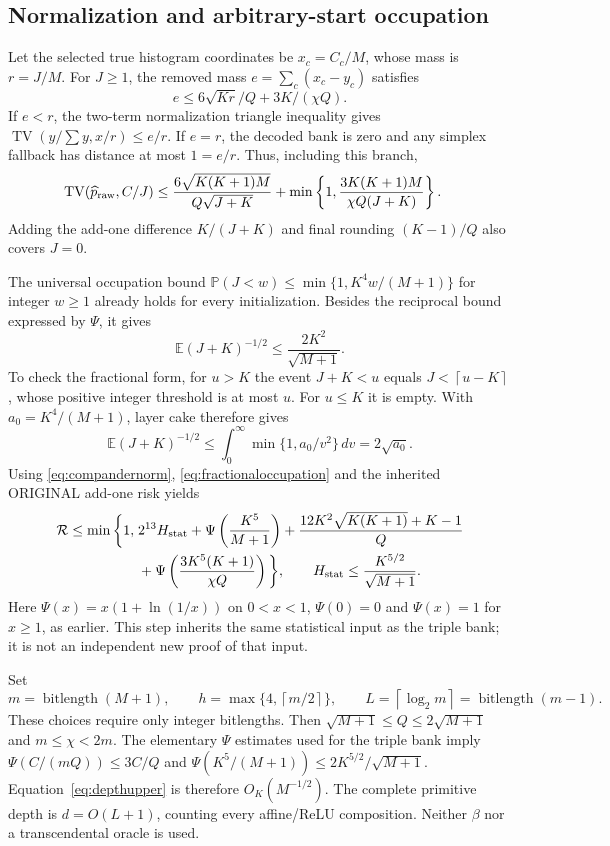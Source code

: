 \documentclass[11pt,letterpaper]{article}
\theoremstyle{definition}\newtheorem{definition}[theorem]{Definition}
\theoremstyle{remark}\newtheorem{remark}[theorem]{Remark}
\newcommand{\TV}{\operatorname{TV}}
\newcommand{\E}{\mathbb{E}}
\newcommand{\Prob}{\mathbb{P}}
\newcommand{\ceil}[1]{\left\lceil #1\right\rceil}
\newcommand{\Risk}{\mathcal{R}}
\newcommand{\bl}{\operatorname{bitlength}}
\begin{document}
\subsection{Normalization and arbitrary-start occupation}
Let the selected true histogram coordinates be $x_c=C_c/M$, whose mass is $r=J/M$. For $J\ge1$, the removed mass $e=\sum_c(x_c-y_c)$ satisfies
\[
 e\le6\sqrt{Kr}/Q+3K/(\chi Q).
\]
If $e<r$, the two-term normalization triangle inequality gives
$\TV(y/\sum y,x/r)\le e/r$. If $e=r$, the decoded bank is zero and any simplex fallback has distance at most $1=e/r$. Thus, including this branch,
\begin{align}\label{eq:compandernorm}
 \TV(\widehat p_{\rm raw},C/J)
 &\le\frac{6\sqrt{K(K+1)M}}{Q\sqrt{J+K}}
   +\min\left\{1,\frac{3K(K+1)M}{\chi Q(J+K)}\right\}.
\end{align}
Adding the add-one difference $K/(J+K)$ and final rounding $(K-1)/Q$ also covers $J=0$.

The universal occupation bound
$\Prob(J<w)\le\min\{1,K^4w/(M+1)\}$ for integer $w\ge1$
already holds for every initialization. Besides the reciprocal bound expressed by $\Psi$, it gives
\begin{equation}\label{eq:fractionaloccupation}
 \E(J+K)^{-1/2}\le\frac{2K^2}{\sqrt{M+1}}.
\end{equation}
To check the fractional form, for $u>K$ the event $J+K<u$ equals
$J<\ceil{u-K}$, whose positive integer threshold is at most $u$.
For $u\le K$ it is empty. With $a_0=K^4/(M+1)$, layer cake therefore gives
\[
 \E(J+K)^{-1/2}
 \le\int_0^\infty\min\{1,a_0/v^2\}\,dv=2\sqrt{a_0}.
\]
Using \eqref{eq:compandernorm}, \eqref{eq:fractionaloccupation} and the inherited ORIGINAL add-one risk yields
\begin{equation}\label{eq:depthupper}
 \begin{split}
 \Risk\le\min\bigg\{1,\;&2^{13}H_{\rm stat}
 +\Psi\left(\frac{K^5}{M+1}\right)
 +\frac{12K^2\sqrt{K(K+1)}+K-1}{Q}\\
 &+\Psi\left(\frac{3K^5(K+1)}{\chi Q}\right)\bigg\},
 \qquad H_{\rm stat}\le\frac{K^{5/2}}{\sqrt{M+1}}.
 \end{split}
\end{equation}
Here $\Psi(x)=x(1+\ln(1/x))$ on $0<x<1$, $\Psi(0)=0$ and $\Psi(x)=1$ for $x\ge1$, as earlier. This step inherits the same statistical input as the triple bank; it is not an independent new proof of that input.

Set
\[
 m=\bl(M+1),\qquad h=\max\{4,\ceil{m/2}\},\qquad
 L=\ceil{\log_2m}=\bl(m-1).
\]
These choices require only integer bitlengths. Then
$\sqrt{M+1}\le Q\le2\sqrt{M+1}$ and $m\le\chi<2m$.
The elementary $\Psi$ estimates used for the triple bank imply
$\Psi(C/(mQ))\le3C/Q$ and
$\Psi(K^5/(M+1))\le2K^{5/2}/\sqrt{M+1}$.
Equation~\eqref{eq:depthupper} is therefore $O_K(M^{-1/2})$.
The complete primitive depth is $d=O(L+1)$, counting every affine/ReLU composition. Neither $\beta$ nor a transcendental oracle is used.
\end{document}
